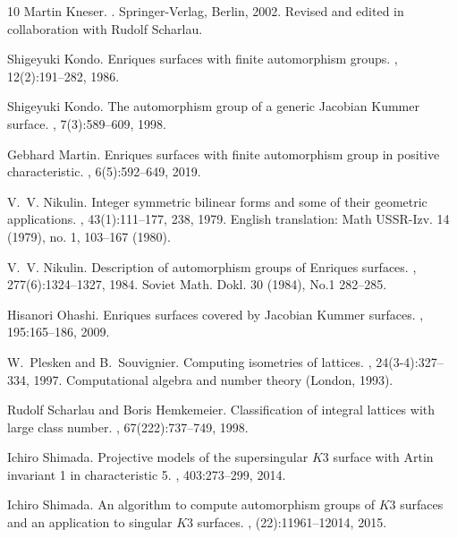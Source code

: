 \documentclass{amsart}
\numberwithin{equation}{section}
\numberwithin{table}{section}
\numberwithin{figure}{section}
\begin{document}
\begin{thebibliography}{10}
Martin Kneser.
.
\newblock Springer-Verlag, Berlin, 2002.
\newblock Revised and edited in collaboration with Rudolf Scharlau.

Shigeyuki Kondo.
\newblock Enriques surfaces with finite automorphism groups.
, 12(2):191--282, 1986.

Shigeyuki Kondo.
\newblock The automorphism group of a generic {J}acobian {K}ummer surface.
, 7(3):589--609, 1998.

Gebhard Martin.
\newblock Enriques surfaces with finite automorphism group in positive
  characteristic.
, 6(5):592--649, 2019.

V.~V. Nikulin.
\newblock Integer symmetric bilinear forms and some of their geometric
  applications.
, 43(1):111--177, 238, 1979.
\newblock English translation: Math USSR-Izv. 14 (1979), no. 1, 103--167
  (1980).

V.~V. Nikulin.
\newblock Description of automorphism groups of {E}nriques surfaces.
, 277(6):1324--1327, 1984.
\newblock Soviet Math. Dokl. 30 (1984), No.1 282--285.

Hisanori Ohashi.
\newblock Enriques surfaces covered by {J}acobian {K}ummer surfaces.
, 195:165--186, 2009.

W.~Plesken and B.~Souvignier.
\newblock Computing isometries of lattices.
, 24(3-4):327--334, 1997.
\newblock Computational algebra and number theory (London, 1993).

Rudolf Scharlau and Boris Hemkemeier.
\newblock Classification of integral lattices with large class number.
, 67(222):737--749, 1998.

Ichiro Shimada.
\newblock Projective models of the supersingular {$K3$} surface with {A}rtin
  invariant 1 in characteristic 5.
, 403:273--299, 2014.

Ichiro Shimada.
\newblock An algorithm to compute automorphism groups of {$K3$} surfaces and an
  application to singular {$K3$} surfaces.
, (22):11961--12014, 2015.


\end{thebibliography}
\end{document}
